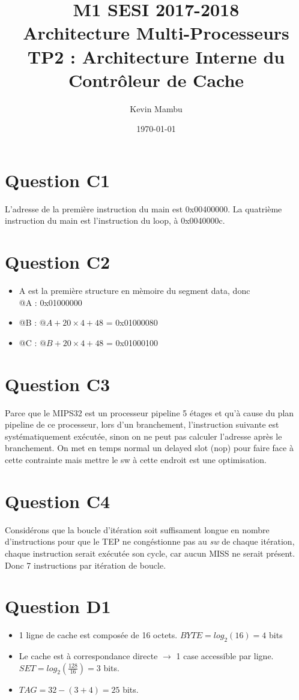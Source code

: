 \documentclass[10pt]{article}
\author{Kevin Mambu}
\date{\today}
\title{M1 SESI 2017-2018\\Architecture Multi-Processeurs\\TP2 : Architecture
Interne du Contrôleur de Cache}
\begin{document}
\maketitle

\section{Question C1}
L'adresse de la première instruction du main est 0x00400000. La quatrième
instruction du main est l'instruction du loop, à 0x0040000c.

\section{Question C2}
\begin{itemize}
  \item A est la première structure en mèmoire du segment data, donc\\
  @A : 0x01000000
  \item @B : $@A+20\times4+48$ = 0x01000080
  \item @C : $@B+20\times4+48$ = 0x01000100
\end{itemize}

\section{Question C3}
Parce que le MIPS32 est un processeur pipeline 5 étages et qu'à cause du plan
pipeline de ce processeur, lors d'un branchement, l'instruction suivante est
systématiquement exécutée, sinon on ne peut pas calculer l'adresse après le
branchement. On met en temps normal un delayed slot (nop) pour faire face à
cette contrainte mais mettre le sw à cette endroit est une optimisation.

\section{Question C4}
Considérons que la boucle d'itération soit suffisament longue en nombre
d'instructions pour que le TEP ne congéstionne pas au {\it sw} de chaque
itération, chaque instruction serait exécutée son cycle, car aucun MISS ne
serait présent. Donc 7 instructions par itération de boucle.

\section{Question D1}
\begin{itemize}
  \item 1 ligne de cache est composée de 16 octets. ${BYTE}=log_2(16)=4$ bits
  \item Le cache est à correspondance directe $\rightarrow$ 1 case accessible
  par ligne.\\
  ${SET}=log_2(\frac{128}{16})=3$ bits.
  \item ${TAG}=32-(3+4)=25$ bits.
\end{itemize}
\end{document}
